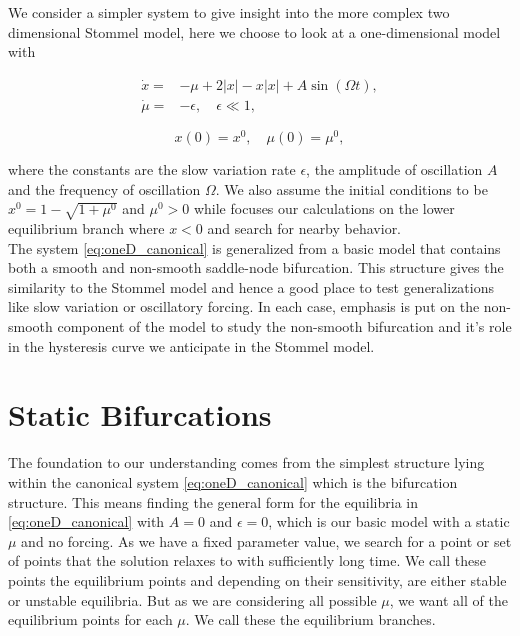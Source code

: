 We consider a simpler system to give insight into the more complex two dimensional Stommel model, here we choose to look at a one-dimensional model with

\begin{equation}\label{eq:oneD_canonical}
\begin{aligned}
\dot{x}=&-\mu+2|x|-x|x|+A\sin(\Omega t),\\
\dot{\mu}=&-\epsilon,\quad \epsilon\ll 1,
\end{aligned}
\end{equation}

\begin{equation*}
x(0)=x^0,\quad\mu(0)=\mu^0,
\end{equation*}

where the constants are the slow variation rate $\epsilon$, the amplitude of oscillation $A$ and the frequency of oscillation $\Omega$. We also assume the initial conditions to be ${x^0=1-\sqrt{1+\mu^0}}$ and $\mu^0>0$ while focuses our calculations on the lower equilibrium branch where $x<0$ and search for nearby behavior.\\
The system \eqref{eq:oneD_canonical} is generalized from a basic model that contains both a smooth and non-smooth saddle-node bifurcation. This structure gives the similarity to the Stommel model and hence a good place to test generalizations like slow variation or oscillatory forcing. In each case, emphasis is put on the non-smooth component of the model to study the non-smooth bifurcation and it's role in the hysteresis curve we anticipate in the Stommel model.

\section{Static Bifurcations}
\label{sec:oneD_static}

The foundation to our understanding comes from the simplest structure lying within the canonical system \eqref{eq:oneD_canonical} which is the bifurcation structure. This means finding the general form for the equilibria in \eqref{eq:oneD_canonical} with $A=0$ and $\epsilon=0$, which is our basic model with a static $\mu$ and no forcing. As we have a fixed parameter value, we search for a point or set of points that the solution relaxes to with sufficiently long time. We call these points the equilibrium points and depending on their sensitivity, are either stable or unstable equilibria. But as we are considering all possible $\mu$, we want all of the equilibrium points for each $\mu$. We call these the equilibrium branches.

